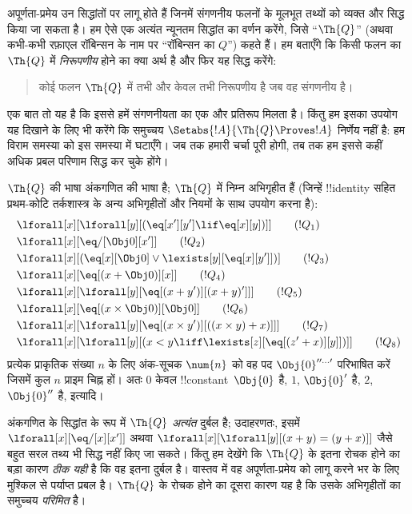\documentclass[../../../include/open-logic-section]{subfiles}
\begin{document}

अपूर्णता-प्रमेय उन सिद्धांतों पर लागू होते हैं जिनमें संगणनीय फलनों के
मूलभूत तथ्यों को व्यक्त और सिद्ध किया जा सकता है। हम ऐसे एक अत्यंत न्यूनतम
सिद्धांत का वर्णन करेंगे, जिसे ``$\Th{Q}$'' (अथवा कभी-कभी रफ़ाएल रॉबिन्सन
के नाम पर ``रॉबिन्सन का $Q$'') कहते हैं। हम बताएँगे कि किसी फलन का
$\Th{Q}$ में \emph{निरूपणीय} होने का क्या अर्थ है और फिर यह सिद्ध करेंगे:
\begin{quote}
  कोई फलन $\Th{Q}$ में तभी और केवल तभी निरूपणीय है जब वह संगणनीय है।
\end{quote}
एक बात तो यह है कि इससे हमें संगणनीयता का एक और प्रतिरूप मिलता है। किंतु
हम इसका उपयोग यह दिखाने के लिए भी करेंगे कि समुच्चय
$\Setabs{!A}{\Th{Q} \Proves !A}$ निर्णेय नहीं है: हम विराम समस्या को इस
समस्या में घटाएँगे। जब तक हमारी चर्चा पूरी होगी, तब तक हम इससे कहीं अधिक
प्रबल परिणाम सिद्ध कर चुके होंगे।

$\Th{Q}$ की भाषा अंकगणित की भाषा है; $\Th{Q}$ में निम्न अभिगृहीत हैं
(जिन्हें !!{identity} सहित प्रथम-कोटि तर्कशास्त्र के अन्य अभिगृहीतों और
नियमों के साथ उपयोग करना है):
\begin{align*}
& \lforall[x][\lforall[y][(\eq[x'][y'] \lif \eq[x][y])]] \tag{$!Q_1$}\\
& \lforall[x][\eq/[\Obj 0][x']] \tag{$!Q_2$}\\
& \lforall[x][(\eq[x][\Obj 0] \lor \lexists[y][\eq[x][y']])] \tag{$!Q_3$}\\
& \lforall[x][\eq[(x + \Obj 0)][x]] \tag{$!Q_4$}\\
& \lforall[x][\lforall[y][\eq[(x + y')][(x + y)']]] \tag{$!Q_5$}\\
& \lforall[x][\eq[(x \times \Obj 0)][\Obj 0]] \tag{$!Q_6$}\\
& \lforall[x][\lforall[y][\eq[(x \times y')][((x \times y) + x)]]] \tag{$!Q_7$}\\
& \lforall[x][\lforall[y][(x < y \liff \lexists[z][\eq[(z' + x)][y]])]] \tag{$!Q_8$}
\end{align*}
प्रत्येक प्राकृतिक संख्या $n$ के लिए अंक-सूचक $\num{n}$ को वह पद
$\Obj{0}^{\prime\prime\ldots\prime}$ परिभाषित करें जिसमें कुल $n$ प्राइम
चिह्न हों। अतः $\num{0}$ केवल !!{constant}~$\Obj{0}$ है, $\num{1}$,
$\Obj{0}'$ है, $\num{2}$, $\Obj{0}''$ है, इत्यादि।

अंकगणित के सिद्धांत के रूप में $\Th{Q}$ \emph{अत्यंत} दुर्बल है; उदाहरणतः,
इसमें $\lforall[x][\eq/[x][x']]$ अथवा
$\lforall[x][\lforall[y][(x + y) = (y + x)]]$ जैसे बहुत सरल तथ्य भी सिद्ध
नहीं किए जा सकते। किंतु हम देखेंगे कि $\Th{Q}$ के इतना रोचक होने का बड़ा
कारण \emph{ठीक यही} है कि वह इतना दुर्बल है। वास्तव में वह अपूर्णता-प्रमेय को
लागू करने भर के लिए मुश्किल से पर्याप्त प्रबल है। $\Th{Q}$ के रोचक होने
का दूसरा कारण यह है कि उसके अभिगृहीतों का समुच्चय \emph{परिमित} है।
\end{document}
